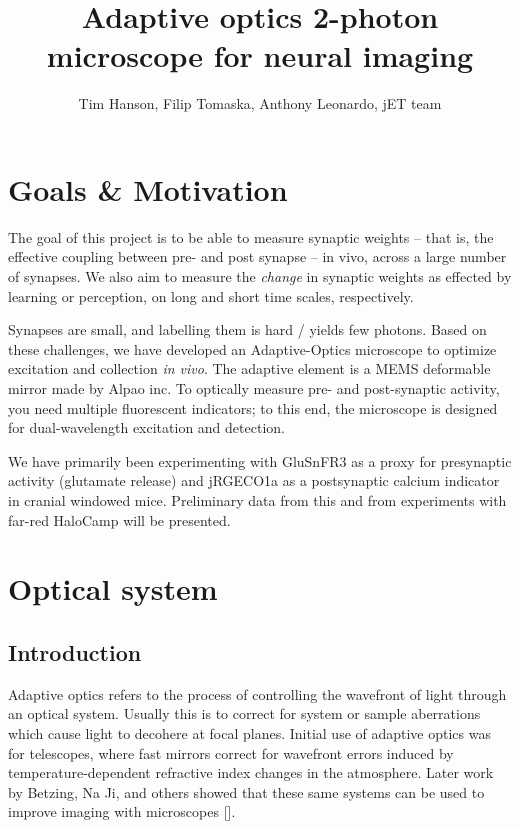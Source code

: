 \documentclass[a4paper,12pt]{article}
\title{Adaptive optics 2-photon microscope for neural imaging}
\author{Tim Hanson, Filip Tomaska, Anthony Leonardo, jET team}
\begin{document}
\maketitle

\begin{abstract}

\end{abstract}

\section{Goals \& Motivation}

The goal of this project is to be able to measure synaptic weights -- that is, the effective coupling between pre- and post synapse -- in vivo, across a large number of synapses.  We also aim to measure the \textit{change} in synaptic weights as effected by learning or perception, on long and short time scales, respectively.  

Synapses are small, and labelling them is hard / yields few photons.  Based on these challenges, we have developed an Adaptive-Optics microscope to optimize excitation and collection \textit{in vivo}. The adaptive element is a MEMS deformable mirror made by Alpao inc.  To optically measure pre- and post-synaptic activity, you need multiple fluorescent indicators; to this end, the microscope is designed for dual-wavelength excitation and detection.

We have primarily been experimenting with GluSnFR3 as a proxy for presynaptic activity (glutamate release) and jRGECO1a as a postsynaptic calcium indicator in cranial windowed mice.  Preliminary data from this and from experiments with far-red HaloCamp will be presented.  

\section{Optical system}

\subsection{Introduction}

Adaptive optics refers to the process of controlling the wavefront of light through an optical system.  Usually this is to correct for system or sample aberrations which cause light to decohere at focal planes.  Initial use of adaptive optics was for telescopes, where fast mirrors correct for wavefront errors induced by temperature-dependent refractive index changes in the atmosphere.  Later work by Betzing, Na Ji, and others showed that these same systems can be used to improve imaging with microscopes [].  
\end{document}
